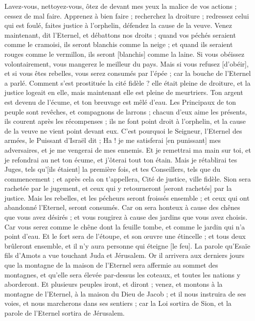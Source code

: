 \begin{multicols}{2}
Lavez-vous, nettoyez-vous, ôtez de devant mes yeux la malice de vos actions ; cessez de mal faire.
Apprenez à bien faire ; recherchez la droiture ; redressez celui qui est foulé, faites justice à l'orphelin, défendez la cause de la veuve.
Venez maintenant, dit l'Eternel, et débattons nos droits ; quand vos péchés seraient comme le cramoisi, ils seront blanchis comme la neige ; et quand ils seraient rouges comme le vermillon, ils seront [blanchis] comme la laine.
Si vous obéissez volontairement, vous mangerez le meilleur du pays.
Mais si vous refusez [d'obéir], et si vous êtes rebelles, vous serez consumés par l'épée ; car la bouche de l'Eternel a parlé.
Comment s'est prostituée la cité fidèle ? elle était pleine de droiture, et la justice logeait en elle, mais maintenant elle est pleine de meurtriers.
Ton argent est devenu de l'écume, et ton breuvage est mêlé d'eau.
Les Principaux de ton peuple sont revêches, et compagnons de larrons ; chacun d'eux aime les présents, ils courent après les récompenses ; ils ne font point droit à l'orphelin, et la cause de la veuve ne vient point devant eux.
C'est pourquoi le Seigneur, l'Eternel des armées, le Puissant d'Israël dit ; Ha ! je me satisferai [en punissant] mes adversaires, et je me vengerai de mes ennemis.
Et je remettrai ma main sur toi, et je refondrai au net ton écume, et j'ôterai tout ton étain.
Mais je rétablirai tes Juges, tels qu'[ils étaient] la première fois, et tes Conseillers, tels que du commencement ; et après cela on t'appellera, Cité de justice, ville fidèle.
Sion sera rachetée par le jugement, et ceux qui y retourneront [seront rachetés] par la justice.
Mais les rebelles, et les pécheurs seront froissés ensemble ; et ceux qui ont abandonné l'Eternel, seront consumés.
Car on sera honteux à cause des chênes que vous avez désirés ; et vous rougirez à cause des jardins que vous avez choisis.
Car vous serez comme le chêne dont la feuille tombe, et comme le jardin qui n'a point d'eau.
Et le fort sera de l'étoupe, et son œuvre une étincelle ; et tous deux brûleront ensemble, et il n'y aura personne qui éteigne [le feu].
\VerseOne{}La parole qu'Esaïe fils d'Amots a vue touchant Juda et Jérusalem.
Or il arrivera aux derniers jours que la montagne de la maison de l'Eternel sera affermie au sommet des montagnes, et qu'elle sera élevée par-dessus les coteaux, et toutes les nations y aborderont.
Et plusieurs peuples iront, et diront ; venez, et montons à la montagne de l'Eternel, à la maison du Dieu de Jacob ; et il nous instruira de ses voies, et nous marcherons dans ses sentiers ; car la Loi sortira de Sion, et la parole de l'Eternel sortira de Jérusalem.

\end{multicols}
